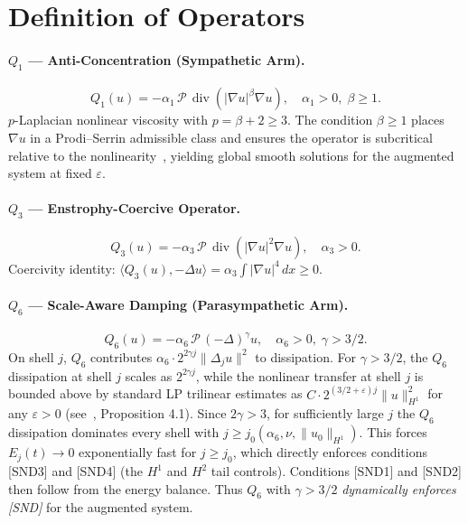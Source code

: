 \documentclass[11pt]{article}
\begin{document}
\section{Definition of Operators}\label{sec:operators}

\paragraph{$Q_1$ --- Anti-Concentration (Sympathetic Arm).}
\[
Q_1(u) = -\alpha_1\,\mathcal{P}\,\operatorname{div}(|\nabla u|^\beta \nabla u),\quad
\alpha_1>0,\;\beta\geq 1.
\]
$p$-Laplacian nonlinear viscosity with $p = \beta+2 \geq 3$. The condition $\beta\geq 1$
places $\nabla u$ in a Prodi--Serrin admissible class and ensures the operator is
subcritical relative to the nonlinearity~\cite{Lions1969}, yielding global smooth solutions
for the augmented system at fixed $\varepsilon$.

\paragraph{$Q_3$ --- Enstrophy-Coercive Operator.}
\[
Q_3(u) = -\alpha_3\,\mathcal{P}\,\operatorname{div}(|\nabla u|^2 \nabla u),\quad \alpha_3>0.
\]
Coercivity identity: $\langle Q_3(u), -\Delta u\rangle = \alpha_3\int|\nabla u|^4\,dx \geq 0$.

\paragraph{$Q_6$ --- Scale-Aware Damping (Parasympathetic Arm).}
\[
Q_6(u) = -\alpha_6\,\mathcal{P}\,(-\Delta)^\gamma u,\quad \alpha_6>0,\;\gamma>3/2.
\]
On shell $j$, $Q_6$ contributes $\alpha_6\cdot 2^{2\gamma j}\|\Delta_j u\|^2$ to dissipation.
For $\gamma > 3/2$, the $Q_6$ dissipation at shell $j$ scales as $2^{2\gamma j}$, while the
nonlinear transfer at shell $j$ is bounded above by standard LP trilinear estimates as
$C\cdot 2^{(3/2+\varepsilon)j}\|u\|_{H^1}^2$ for any $\varepsilon>0$
(see~\cite{BCD2011}, Proposition 4.1). Since $2\gamma > 3$, for sufficiently large $j$
the $Q_6$ dissipation dominates every shell with $j \geq j_0(\alpha_6, \nu, \|u_0\|_{H^1})$.
This forces $E_j(t) \to 0$ exponentially fast for $j \geq j_0$, which directly enforces
conditions [SND3] and [SND4] (the $H^1$ and $H^2$ tail controls). Conditions [SND1] and
[SND2] then follow from the energy balance. Thus $Q_6$ with $\gamma > 3/2$
\emph{dynamically enforces [SND]} for the augmented system.
\end{document}
